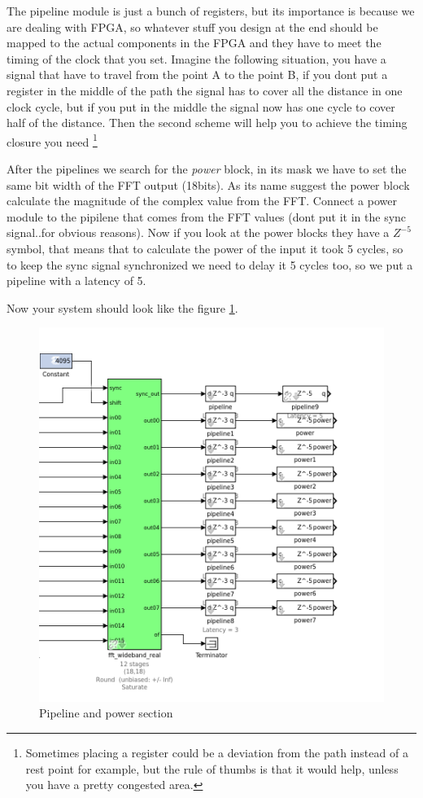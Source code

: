 The pipeline module is just a bunch of registers, but its importance is because we are dealing with FPGA, so whatever stuff you design at the end should be mapped to the actual components in the FPGA and they have to meet the timing of the clock that you set.
Imagine the following situation, you have a signal that have to travel from the point A to the point B, if you dont put a register in the middle of the path the signal has to cover all the distance in one clock cycle, but if you put in the middle the signal now has one cycle to cover half of the distance. Then the second scheme will help you to achieve the timing closure you need  \footnote{Sometimes placing a register could be a deviation from the path instead of a rest point for example, but the rule of thumbs is that it would help, unless you have a pretty congested area.}




After the pipelines we search for the \textit{power} block, in its mask we have to set the same bit width of the FFT output (18bits). As its name suggest the power block calculate the magnitude of the complex value from the FFT. Connect a power module to the pipilene that comes from the FFT values (dont put it in the sync signal..for obvious reasons).
Now if you look at the power blocks they have a $Z^{-5}$ symbol, that means that to calculate the power of the input it took 5 cycles, so to keep the sync signal synchronized we need to delay it 5 cycles too, so we put a pipeline with a latency of 5.

Now your system should look like the figure \ref{fig:power}.

\begin{figure}
    \centering
    \includegraphics[scale=0.4]{images/power.png}
    \caption{Pipeline and power section}
    \label{fig:power}
\end{figure}



